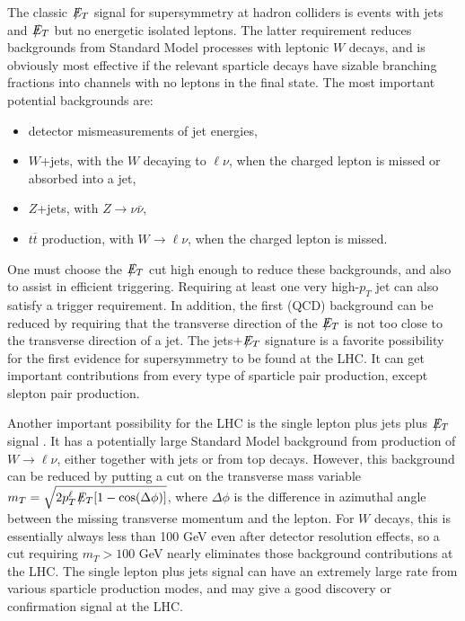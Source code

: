 \documentclass[11pt]{article}
\def\Et{{\slashchar{E}_T}}
\def\slashchar#1{\setbox0=\hbox{$#1$}           %
   \dimen0=\wd0                                 %
   \setbox1=\hbox{/} \dimen1=\wd1               %
   \ifdim\dimen0>\dimen1                        %
      \rlap{\hbox to \dimen0{\hfil/\hfil}}      %
      #1                                        %
   \else                                        %
      \rlap{\hbox to \dimen1{\hfil$#1$\hfil}}   %
      /                                         %
   \fi}                                        %
\begin{document}
The classic $\Et$ signal for supersymmetry at hadron colliders is events 
with jets and $\Et$ but no energetic isolated leptons. The latter 
requirement reduces backgrounds from Standard Model processes with 
leptonic $W$ decays, and is obviously most effective if the relevant 
sparticle decays have sizable branching fractions into channels with no 
leptons in the final state. The most important potential backgrounds are:
\begin{itemize}
\item detector mismeasurements of jet energies,
\item $W$+jets, with the $W$ decaying to $\ell\nu$, when the charged lepton is missed or absorbed into a jet,
\item $Z$+jets, with $Z \rightarrow \nu \bar \nu$,
\item $t\overline t$ production, with $W\rightarrow \ell\nu$, when the charged lepton is 
missed.
\end{itemize}
One must choose the $\Et$ cut high enough to reduce these backgrounds, and also to assist in efficient triggering. Requiring at least one very high-$p_T$ jet can also satisfy a trigger requirement. In addition, the first (QCD) 
background can be reduced by requiring that the transverse direction of the $\Et$ is not 
too close to the transverse direction of a jet. The jets$+\Et$ signature is a favorite possibility for the 
first evidence for supersymmetry to be found at the LHC. 
It can get important contributions from 
every type of sparticle pair production, except slepton pair production.

Another important possibility for the LHC is the single lepton plus jets plus $\Et$ signal 
\cite{LHCdiscovery}. It has a potentially large Standard Model 
background from production of 
$W\rightarrow\ell\nu$, either together with jets or from top decays. 
However, this background can 
be reduced by putting a cut on the transverse mass variable 
$m_T = \sqrt{2 p_T^\ell \Et [1 - \cos(\Delta \phi)]}$, 
where $\Delta \phi$ is the difference in azimuthal angle between the missing 
transverse momentum and the lepton. For $W$ decays, this is essentially always less than 
100 GeV even after detector resolution effects, 
so a cut requiring $m_T > 100$ GeV nearly eliminates those background 
contributions at the LHC. 
The single lepton plus jets signal can have an extremely large rate from various sparticle 
production modes, and may give a good discovery or confirmation signal at the LHC.
\end{document}
